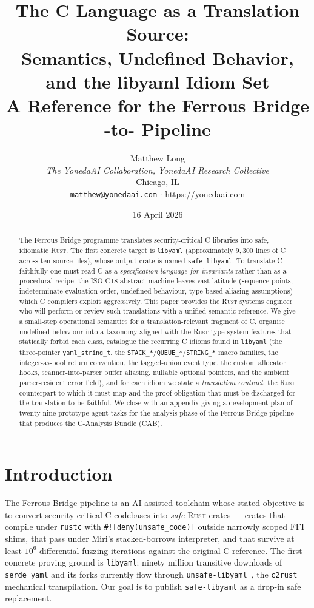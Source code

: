\documentclass[12pt]{article}
\title{The C Language as a Translation Source:\\
Semantics, Undefined Behavior, and the libyaml Idiom Set\\
\vspace{0.5em}
\large A Reference for the Ferrous Bridge \clang{}-to-\rust{} Pipeline}
\author{Matthew Long \\
\textit{The YonedaAI Collaboration, YonedaAI Research Collective} \\
Chicago, IL \\
\texttt{matthew@yonedaai.com} $\cdot$ \url{https://yonedaai.com}}
\date{16 April 2026}
\newcommand{\rust}{\textnormal{\textsc{Rust}}}
\newcommand{\clang}{\textnormal{\textsc{C}}}
\newcommand{\libyaml}{\texttt{libyaml}}
\newcommand{\safelibyaml}{\texttt{safe-libyaml}}
\newcommand{\unsafelibyaml}{\texttt{unsafe-libyaml}}
\theoremstyle{definition}
\theoremstyle{remark}
\begin{document}
\maketitle

\begin{abstract}
The Ferrous Bridge programme translates security-critical C libraries into safe, idiomatic \rust{}. The first concrete target is \libyaml{} (approximately \(9{,}300\) lines of C across ten source files), whose output crate is named \safelibyaml{}. To translate \clang{} faithfully one must read \clang{} as a \emph{specification language for invariants} rather than as a procedural recipe: the ISO C18 abstract machine leaves vast latitude (sequence points, indeterminate evaluation order, undefined behaviour, type-based aliasing assumptions) which \clang{} compilers exploit aggressively. This paper provides the \rust{} systems engineer who will perform or review such translations with a unified semantic reference. We give a small-step operational semantics for a translation-relevant fragment of \clang{}, organise undefined behaviour into a taxonomy aligned with the \rust{} type-system features that statically forbid each class, catalogue the recurring \clang{} idioms found in \libyaml{} (the three-pointer \texttt{yaml\_string\_t}, the \texttt{STACK\_*}/\texttt{QUEUE\_*}/\texttt{STRING\_*} macro families, the integer-as-bool return convention, the tagged-union event type, the custom allocator hooks, scanner-into-parser buffer aliasing, nullable optional pointers, and the ambient parser-resident error field), and for each idiom we state a \emph{translation contract}: the \rust{} counterpart to which it must map and the proof obligation that must be discharged for the translation to be faithful. We close with an appendix giving a development plan of twenty-nine prototype-agent tasks for the analysis-phase of the Ferrous Bridge pipeline that produces the C-Analysis Bundle (CAB).
\end{abstract}

\tableofcontents
\newpage

\section{Introduction}
\label{sec:intro}

The Ferrous Bridge pipeline is an AI-assisted toolchain whose stated objective is to convert security-critical \clang{} codebases into \emph{safe} \rust{} crates --- crates that compile under \texttt{rustc} with \texttt{\#![deny(unsafe\_code)]} outside narrowly scoped FFI shims, that pass under Miri's stacked-borrows interpreter, and that survive at least \(10^{6}\) differential fuzzing iterations against the original \clang{} reference. The first concrete proving ground is \libyaml{}: ninety million transitive downloads of \texttt{serde\_yaml} and its forks currently flow through \unsafelibyaml{}~\cite{ferrousagent2026}, the \texttt{c2rust}~\cite{c2rust2025} mechanical transpilation. Our goal is to publish \safelibyaml{} as a drop-in safe replacement.
\end{document}
